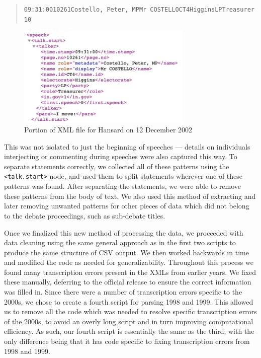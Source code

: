 \documentclass[
  letterpaper,
  DIV=11,
  numbers=noendperiod]{scrartcl}
\begin{document}
\begin{quote}
\texttt{09:31:0010261Costello,\ Peter,\ MPMr\ COSTELLOCT4HigginsLPTreasurer10}
\end{quote}

\begin{figure}

{\centering \includegraphics[width=3.28125in,height=\textheight]{patternEX.jpg}

}

\caption{\label{fig-patternEX}Portion of XML file for Hansard on 12
December 2002}

\end{figure}

This was not isolated to just the beginning of speeches --- details on
individuals interjecting or commenting during speeches were also
captured this way. To separate statements correctly, we collected all of
these patterns using the \texttt{\textless{}talk.start\textgreater{}}
node, and used them to split statements wherever one of these patterns
was found. After separating the statements, we were able to remove these
patterns from the body of text. We also used this method of extracting
and later removing unwanted patterns for other pieces of data which did
not belong to the debate proceedings, such as sub-debate titles.

Once we finalized this new method of processing the data, we proceeded
with data cleaning using the same general approach as in the first two
scripts to produce the same structure of CSV output. We then worked
backwards in time and modified the code as needed for generalizability.
Throughout this process we found many transcription errors present in
the XMLs from earlier years. We fixed these manually, deferring to the
official release to ensure the correct information was filled in. Since
there were a number of transcription errors specific to the 2000s, we
chose to create a fourth script for parsing 1998 and 1999. This allowed
us to remove all the code which was needed to resolve specific
transcription errors of the 2000s, to avoid an overly long script and in
turn improving computational efficiency. As such, our fourth script is
essentially the same as the third, with the only difference being that
it has code specific to fixing transcription errors from 1998 and 1999.
\end{document}
